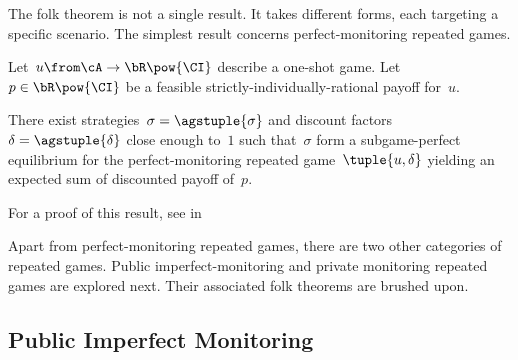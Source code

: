 \begin{example}
\begin{figure}[th]
\centering
{}
\label{fig:bos_feasible_enforceable_payoffs}
\end{figure}
\end{example}

The folk theorem is not a single result.
It takes different forms, each targeting a specific scenario.
The simplest result concerns perfect-monitoring repeated games.

\begin{theorem}
\label{res:perfect-monitoring_folk_theorem}
Let~\(u \from \cA \to \bR\pow{\CI}\) describe a one-shot game.
Let~\(p \in \bR\pow{\CI}\) be a feasible strictly-individually-rational payoff for~\(u\).

There exist strategies~\(\sigma = \agstuple{\sigma}\) and discount factors~\(\delta = \agstuple{\delta}\) close enough to~\(1\) such that~\(\sigma\) form a subgame-perfect equilibrium for the perfect-monitoring repeated game~\(\tuple{u, \delta}\) yielding an expected sum of discounted payoff of~\(p\).
\end{theorem}
For a proof of this result, see in~\cite[Proposition~3.8.1]{mailath_samuelson:2006}

Apart from perfect-monitoring repeated games, there are two other categories of repeated games.
Public imperfect-monitoring and private monitoring repeated games are explored next.
Their associated folk theorems are brushed upon.

\subsection{Public Imperfect Monitoring}

